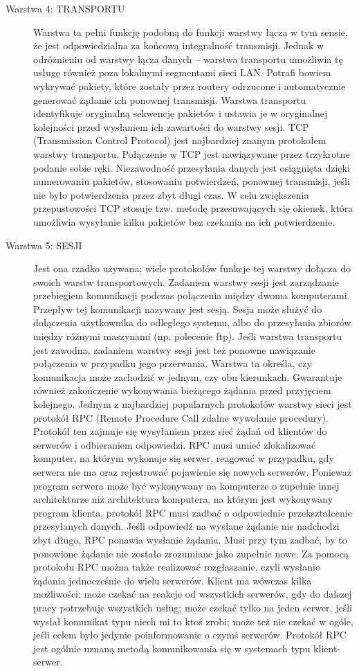 \documentclass[a4paper,11pt]{article}
\begin{document}
\begin{description}
\item[Warstwa 4: TRANSPORTU] Warstwa ta pełni funkcję podobną do funkcji warstwy łącza w tym sensie, że jest odpowiedzialna za końcową integralność transmisji. Jednak w odróżnieniu od warstwy łącza danych -- warstwa transportu umożliwia tę usługę również poza lokalnymi segmentami sieci LAN. Potrafi bowiem wykrywać pakiety, które zostały przez routery odrzucone i automatycznie generować żądanie ich ponownej transmisji. Warstwa transportu identyfikuje oryginalną sekwencję pakietów i ustawia je w oryginalnej kolejności przed wysłaniem ich zawartości do warstwy sesji. TCP (Transmission Control Protocol) jest najbardziej znanym protokołem warstwy transportu. Połączenie w TCP jest nawiązywane przez trzykrotne podanie sobie ręki. Niezawodność przesyłania danych jest osiągnięta dzięki numerowaniu pakietów, stosowaniu potwierdzeń, ponownej transmisji, jeśli nie było potwierdzenia przez zbyt długi czas. W celu zwiększenia przepustowości TCP stosuje tzw. metodę przesuwających się okienek, która umożliwia wysyłanie kilku pakietów bez czekania na ich potwierdzenie.

\item[Warstwa 5: SESJI] Jest ona rzadko używana; wiele protokołów funkcje tej warstwy dołącza do swoich warstw transportowych. Zadaniem warstwy sesji jest zarządzanie przebiegiem komunikacji podczas połączenia między dwoma komputerami. Przepływ tej komunikacji nazywany jest sesją. Sesja może służyć do dołączenia użytkownika do odległego systemu, albo do przesyłania zbiorów między różnymi maszynami (np. polecenie ftp). Jeśli warstwa transportu jest zawodna, zadaniem warstwy sesji jest też ponowne nawiązanie połączenia w przypadku jego przerwania. Warstwa ta określa, czy komunikacja może zachodzić w jednym, czy obu kierunkach. Gwarantuje również zakończenie wykonywania bieżącego żądania przed przyjęciem kolejnego. Jednym z najbardziej popularnych protokołów warstwy sieci jest protokół RPC (Remote Procedure Call  zdalne wywołanie procedury). Protokół ten zajmuje się wysyłaniem przez sieć żądań od klientów do serwerów i odbieraniem odpowiedzi. RPC musi umieć zlokalizować komputer, na którym wykonuje się serwer, reagować w przypadku, gdy serwera nie ma oraz rejestrować pojawienie się nowych serwerów. Ponieważ program serwera może być wykonywany na komputerze o zupełnie innej architekturze niż architektura komputera, na którym jest wykonywany program klienta, protokół RPC musi zadbać o odpowiednie przekształcenie przesyłanych danych.  Jeśli odpowiedź na wysłane żądanie nie nadchodzi zbyt długo, RPC ponawia wysłanie żądania. Musi przy tym zadbać, by to ponowione żądanie nie zostało zrozumiane jako zupełnie nowe. Za pomocą protokołu RPC można także realizować rozgłaszanie, czyli wysłanie żądania jednocześnie do wielu serwerów. Klient ma wówczas kilka możliwości: może czekać na reakcje od wszystkich serwerów, gdy do dalszej pracy potrzebuje wszystkich usług; może czekać tylko na jeden serwer, jeśli wysłał komunikat typu niech mi to ktoś zrobi; może też nie czekać w ogóle, jeśli celem było jedynie poinformowanie o czymś serwerów. Protokół RPC jest ogólnie uznaną metodą komunikowania się w systemach typu klient-serwer.  


\end{description}
\end{document}
